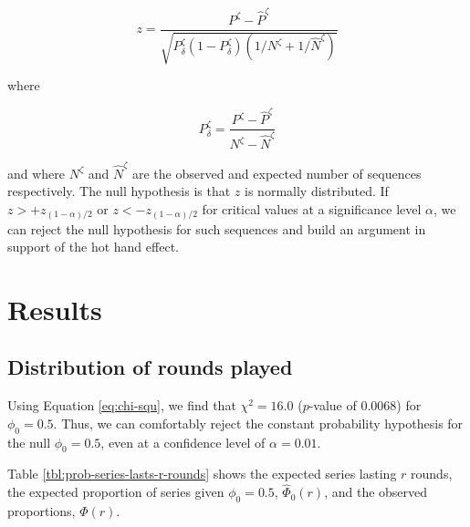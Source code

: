 \documentclass{article}
\begin{document}
\begin{equation}\label{eq:prop}
z = \frac{P^\zeta - \hat{P}^\zeta}{\sqrt{P^\zeta_{\delta} (1 - P^\zeta_{\delta}) (1 / N^\zeta + 1 / \hat{N}^\zeta)  } }
\end{equation}

where

\[
P^\zeta_{\delta} = \frac{P^\zeta - \hat{P}^\zeta}{N^\zeta - \hat{N}^\zeta}
\]

and where \(N^\zeta\) and \(\hat{N}^\zeta\) are the observed and
expected number of sequences respectively. The null hypothesis is that
\(z\) is normally distributed. If \(z > +z_{(1-\alpha)/2}\) or
\(z < -z_{(1-\alpha)/2}\) for critical values at a significance level
\(\alpha\), we can reject the null hypothesis for such sequences and
build an argument in support of the hot hand effect.

\hypertarget{results}{%
\section{Results}\label{results}}

\hypertarget{distribution-of-rounds-played-1}{%
\subsection{Distribution of rounds
played}\label{distribution-of-rounds-played-1}}

Using Equation \ref{eq:chi-squ}, we find that \(\chi^2 = 16.0\)
(\(p\)-value of 0.0068) for \(\phi_0 = 0.5\). Thus, we can comfortably
reject the constant probability hypothesis for the null
\(\phi_0 = 0.5\), even at a confidence level of \(\alpha = 0.01\).

Table \ref{tbl:prob-series-lasts-r-rounds} shows the expected series
lasting \(r\) rounds, the expected proportion of series given
\(\phi_0 = 0.5\), \(\hat{\Phi}_0(r)\), and the observed proportions,
\(\Phi(r)\).
\end{document}
